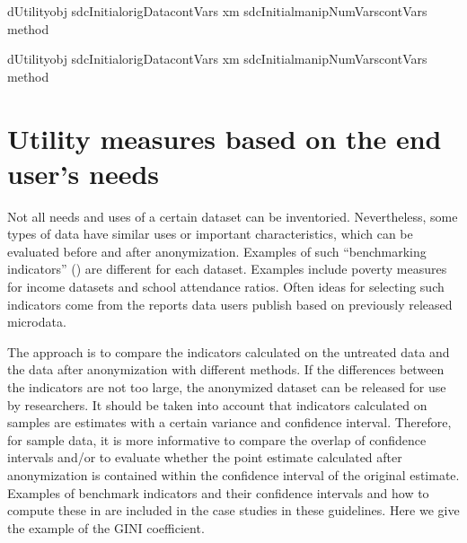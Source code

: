 \documentclass[letterpaper,10pt,english]{sphinxmanual}
\begin{document}
\def\sphinxLiteralBlockLabel{\label{\detokenize{utility:code68}}}
%
\begin{sphinxVerbatim}[commandchars=\\\{\},numbers=left,firstnumber=1,stepnumber=1]
dUtilityobj  sdcInitialorigData\PYG{p}{[}contVars\PYG{p}{]}
         xm  sdcInitialmanipNumVars\PYG{p}{[}contVars\PYG{p}{]} method  

dUtilityobj  sdcInitialorigData\PYG{p}{[}contVars\PYG{p}{]}
         xm  sdcInitialmanipNumVars\PYG{p}{[}contVars\PYG{p}{]} method  
\end{sphinxVerbatim}


\section{Utility measures based on the end user’s needs}
\label{\detokenize{utility:utility-measures-based-on-the-end-users-needs}}
Not all needs and uses of a certain dataset can be inventoried.
Nevertheless, some types of data have similar uses or important
characteristics, which can be evaluated before and after anonymization.
Examples of such “benchmarking indicators” ({\hyperref[\detokenize{utility:tmkc14}]{}}) are
different for each dataset. Examples include poverty measures for income
datasets and school attendance ratios. Often ideas for selecting such
indicators come from the reports data users publish based on previously
released microdata.

The approach is to compare the indicators calculated on the untreated
data and the data after anonymization with different methods. If the
differences between the indicators are not too large, the anonymized
dataset can be released for use by researchers. It should be taken into
account that indicators calculated on samples are estimates with a
certain variance and confidence interval. Therefore, for sample data, it
is more informative to compare the overlap of confidence intervals
and/or to evaluate whether the point estimate calculated after
anonymization is contained within the confidence interval of the
original estimate. Examples of benchmark indicators and their confidence
intervals and how to compute these in  are included in the case
studies in these guidelines. Here we give the example of the GINI
coefficient.
\end{document}
